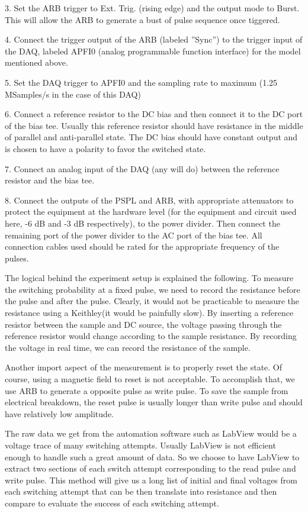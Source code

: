3. Set the ARB trigger to Ext. Trig. (rising edge) and the output mode to Burst. This will allow the ARB to generate a bust of pulse sequence once tiggered. 

4. Connect the trigger output of the ARB (labeled ”Sync”) to the trigger input of the DAQ, labeled APFI0 (analog programmable function interface) for the model mentioned above.

5. Set the DAQ trigger to APFI0 and the sampling rate to maximum (1.25 MSamples/s in the case of this DAQ)

6. Connect a reference resistor to the DC bias and then connect it to the DC port of the bias tee. Usually this reference resistor should have resistance in the middle of parallel and anti-parallel state. The DC bias should have constant output and is chosen to have a polarity to favor the switched state.

7. Connect an analog input of the DAQ (any will do) between the reference resistor and the bias tee.

8. Connect the outputs of the PSPL and ARB, with appropriate attenuators to protect the equipment at the hardware level (for the equipment and circuit used here, -6 dB and -3 dB respectively), to the power divider. Then connect the remaining port of the power divider to the AC port of the bias tee. All connection cables used should be rated for the appropriate frequency of the pulses.

The logical behind the experiment setup is explained the following. To measure the switching probability at a fixed pulse, we need to record the resistance before the pulse and after the pulse. Clearly, it would not be practicable to measure the resistance using a Keithley(it would be painfully slow). By inserting a reference resistor between the sample and DC source, the voltage passing through the reference resistor would change according to the sample resistance. By recording the voltage in real time, we can record the resistance of the sample.

Another import aspect of the measurement is to properly reset the state. Of course, using a magnetic field to reset is not acceptable. To accomplish that, we use ARB to generate a opposite pulse as write pulse. To save the sample from electrical breakdown, the reset pulse is usually longer than write pulse and should have relatively low amplitude.

The raw data we get from the automation software such as LabView would be a voltage trace of many switching attempts. Usually LabView is not efficient enough to handle such a great amount of data. So we choose to have LabView to extract two sections of each switch attempt corresponding to the read pulse and write pulse. This method will give us a long list of initial and final voltages from each switching attempt that can be then translate into resistance and then compare to evaluate the success of each switching attempt.

